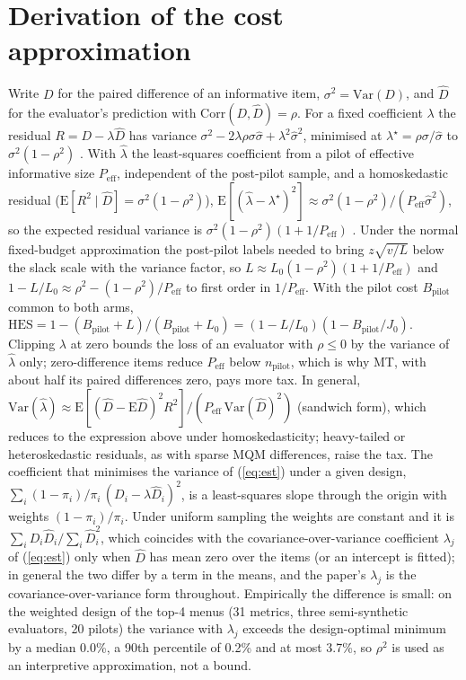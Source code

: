\documentclass[11pt]{article}
\newcommand{\HES}{\mathrm{HES}}
\newcommand{\np}{n_{\mathrm{pilot}}}
\newcommand{\Bp}{B_{\mathrm{pilot}}}
\begin{document}
\section{Derivation of the cost approximation}\label{app:law}
Write $D$ for the paired difference of an informative item, $\sigma^2=\mathrm{Var}(D)$, and $\hat D$ for the evaluator's
prediction with $\mathrm{Corr}(D,\hat D)=\rho$. For a fixed coefficient $\lambda$ the residual $R=D-\lambda\hat D$ has
variance $\sigma^2-2\lambda\rho\sigma\hat\sigma+\lambda^2\hat\sigma^2$, minimised at $\lambda^\star=\rho\sigma/\hat\sigma$ to
$\sigma^2(1-\rho^2)$ \citep{angelopoulos2023ppipp}. With $\hat\lambda$ the least-squares coefficient from a
pilot of effective informative size $P_{\mathrm{eff}}$, independent of the post-pilot sample, and a homoskedastic residual ($\mathrm{E}[R^2\mid\hat D]=\sigma^2(1-\rho^2)$), $\mathrm{E}[(\hat\lambda-\lambda^\star)^2]\approx
\sigma^2(1-\rho^2)/(P_{\mathrm{eff}}\hat\sigma^2)$, so the expected residual variance is
$\sigma^2(1-\rho^2)(1+1/P_{\mathrm{eff}})$ \citep[\S7]{cochran1977}. Under the normal fixed-budget approximation the
post-pilot labels needed to bring $z\sqrt{v/L}$ below the slack scale with the variance factor, so
$L\approx L_0(1-\rho^2)(1+1/P_{\mathrm{eff}})$ and $1-L/L_0\approx\rho^2-(1-\rho^2)/P_{\mathrm{eff}}$ to first order in
$1/P_{\mathrm{eff}}$. With the pilot cost $\Bp$ common to both arms, $\HES=1-(\Bp+L)/(\Bp+L_0)=(1-L/L_0)(1-\Bp/J_0)$. Clipping
$\lambda$ at zero bounds the loss of an evaluator with $\rho\le0$ by the variance of $\hat\lambda$ only; zero-difference
items reduce $P_{\mathrm{eff}}$ below $\np$, which is why MT, with about half its paired differences zero, pays more tax.
In general, $\mathrm{Var}(\hat\lambda)\approx\mathrm{E}[(\hat D-\mathrm{E}\hat D)^2R^2]/(P_{\mathrm{eff}}\,\mathrm{Var}(\hat D)^2)$ (sandwich form), which reduces to the expression above under homoskedasticity; heavy-tailed or heteroskedastic residuals, as with sparse MQM differences, raise the tax.
The coefficient that minimises the variance of (\ref{eq:est}) under a given design, $\sum_i(1-\pi_i)/\pi_i\,(D_i-\lambda\hat D_i)^2$, is a
least-squares slope through the origin with weights $(1-\pi_i)/\pi_i$. Under uniform sampling the weights are constant
and it is $\sum_i D_i\hat D_i/\sum_i\hat D_i^2$, which coincides with the covariance-over-variance coefficient
$\lambda_j$ of (\ref{eq:est}) only when $\hat D$ has mean zero over the items (or an intercept is fitted); in general
the two differ by a term in the means, and the paper's $\lambda_j$ is the covariance-over-variance form throughout.
Empirically the difference is small: on the weighted design of the top-4 menus (31 metrics, three semi-synthetic
evaluators, 20 pilots) the variance with $\lambda_j$ exceeds the design-optimal minimum by a median 0.0\%, a 90th
percentile of 0.2\% and at most 3.7\%, so $\rho^2$ is used as an interpretive approximation, not a bound.
\end{document}
